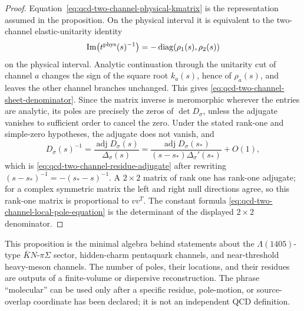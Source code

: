 \begin{proof}
Equation~\eqref{eq:qcd-two-channel-physical-kmatrix} is the representation
assumed in the proposition.  On the physical interval it is equivalent to the
two-channel elastic-unitarity identity
\[
  \operatorname{Im}\bigl(t^{\rm phys}(s)^{-1}\bigr)
  =
  -\operatorname{diag}(\rho_1(s),\rho_2(s))
\]
on the physical interval.  Analytic continuation through the unitarity cut of
channel \(a\) changes the sign of the square root \(k_a(s)\), hence of
\(\rho_a(s)\), and leaves the other channel branches unchanged.  This gives
\eqref{eq:qcd-two-channel-sheet-denominator}.  Since the matrix inverse is
meromorphic wherever the entries are analytic, its poles are precisely the
zeros of \(\det D_\sigma\), unless the adjugate vanishes to sufficient order
to cancel the zero.  Under the stated rank-one and simple-zero hypotheses,
the adjugate does not vanish, and
\[
  D_\sigma(s)^{-1}
  =
  \frac{\operatorname{adj}D_\sigma(s)}
       {\Delta_\sigma(s)}
  =
  \frac{\operatorname{adj}D_\sigma(s_\ast)}
       {(s-s_\ast)\Delta_\sigma'(s_\ast)}
  +O(1),
\]
which is \eqref{eq:qcd-two-channel-residue-adjugate} after rewriting
\((s-s_\ast)^{-1}=-(s_\ast-s)^{-1}\).  A \(2\times2\) matrix of rank one has
rank-one adjugate; for a complex symmetric matrix the left and right null
directions agree, so this rank-one matrix is proportional to \(vv^T\).  The
constant formula \eqref{eq:qcd-two-channel-local-pole-equation} is the
determinant of the displayed \(2\times2\) denominator.
\end{proof}

This proposition is the minimal algebra behind statements about the
\(\Lambda(1405)\)-type \(\bar K N\)-\(\pi\Sigma\) sector, hidden-charm
pentaquark channels, and near-threshold heavy-meson channels.  The number of
poles, their locations, and their residues are outputs of a finite-volume or
dispersive reconstruction.  The phrase ``molecular'' can be used only after a
specific residue, pole-motion, or source-overlap coordinate has been declared;
it is not an independent QCD definition.

